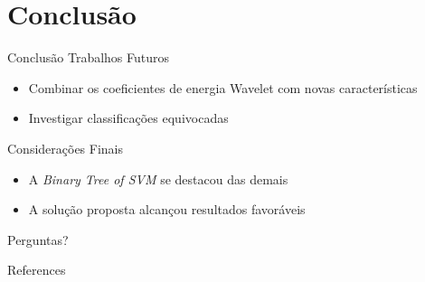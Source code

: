 \documentclass[10pt]{beamer}
\begin{document}
\section{Conclusão}

\begin{frame}{Conclusão}
  Trabalhos Futuros
  \begin{itemize}
    \item Combinar os coeficientes de energia Wavelet com novas características
    \item Investigar classificações equivocadas
  \end{itemize}

  Considerações Finais
  \begin{itemize}
    \item A \textit{Binary Tree of SVM} se destacou das demais
    \item A solução proposta alcançou resultados favoráveis
  \end{itemize}
\end{frame}

 {
 \begin{frame}[standout]
   Perguntas?
 \end{frame}
}

\appendix


\begin{frame}[allowframebreaks]{References}

  
  

\end{frame}



\begin{frame}
\end{frame}
\end{document}
